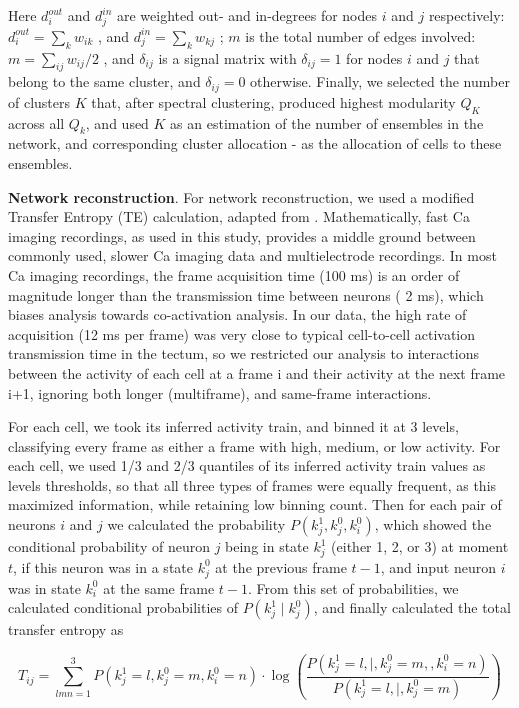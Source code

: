 \documentclass{article}
\begin{document}
Here $d^{out}_i$ and $d^{in}_j$ are weighted out- and in-degrees for nodes $i$ and $j$ respectively: $d^{out}_i = \sum_k{w_{ik}}$ , and $d^{in}_j = \sum_k{w_{kj}}$ ; $m$ is the total number of edges involved: $m = \sum_{ij}{w_{ij}}/2$ , and $\delta_{ij}$ is a signal matrix with $\delta_{ij}=1$ for nodes $i$ and $j$ that belong to the same cluster, and $\delta_{ij} = 0$ otherwise. Finally, we selected the number of clusters $K$ that, after spectral clustering, produced highest modularity $Q_K$ across all $Q_k$, and used $K$ as an estimation of the number of ensembles in the network, and corresponding cluster allocation - as the allocation of cells to these ensembles.

\textbf{Network reconstruction}. For network reconstruction, we used a modified Transfer Entropy (TE) calculation, adapted from \citep{stetter2012te,gourevitch2007te}. Mathematically, fast Ca imaging recordings, as used in this study, provides a middle ground between commonly used, slower Ca imaging data and multielectrode recordings. In most Ca imaging recordings, the frame acquisition time (100 ms) is an order of magnitude longer than the transmission time between neurons ( 2 ms), which biases analysis towards co-activation analysis. In our data, the high rate of acquisition (12 ms per frame) was very close to typical cell-to-cell activation transmission time in the tectum, so we restricted our analysis to interactions between the activity of each cell at a frame i and their activity at the next frame i+1, ignoring both longer (multiframe), and same-frame interactions.

For each cell, we took its inferred activity train, and binned it at 3 levels, classifying every frame as either a frame with high, medium, or low activity. For each cell, we used 1/3 and 2/3 quantiles of its inferred activity train values as levels thresholds, so that all three types of frames were equally frequent, as this maximized information, while retaining low binning count. Then for each pair of neurons $i$ and $j$ we calculated the probability $P(k_j^1,k_j^0,k_i^0)$, which showed the conditional probability of neuron $j$ being in state $k_j^1$ (either 1, 2, or 3) at moment $t$, if this neuron was in a state $k_j^0$ at the previous frame $t-1$, and  input neuron $i$ was in state $k_i^0$ at the same frame $t-1$. From this set of probabilities, we calculated conditional probabilities of $P(k_j^1 \mid k_j^0)$, and finally calculated the total transfer entropy as

\[ T_{ij} = \sum_{lmn=1}^3{P(k_j^1=l,k_j^0=m,k_i^0=n)}\cdot \log\left(\frac{P(k_j^1=l , \mid , k_j^0=m, , k_i^0=n)}{P(k_j^1=l , \mid , k_j^0=m)}\right) \]
\end{document}
